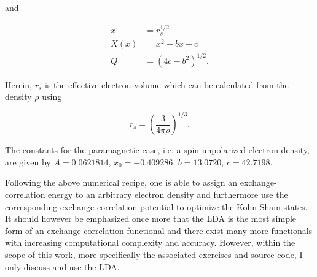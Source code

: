 and

\begin{align}
	x &= r_{s}^{1/2} \\
	X(x) &= x^{2} + bx + c \\
	Q &= \left(4c - b^{2}\right)^{1/2}.
\end{align}

Herein, $r_{s}$ is the effective electron volume which can be calculated from the density $\rho$ using

\begin{equation}
	r_{s} = \left( \dfrac{3}{4 \pi \rho} \right)^{1/3}.
\end{equation}

The constants for the paramagnetic case, i.e. a spin-unpolarized electron density, are given by $A = 0.0621814$, $x_{0} = -0.409286$, $b = 13.0720$, $c = 42.7198$.

Following the above numerical recipe, one is able to assign an exchange-correlation energy to an arbitrary electron density and furthermore use the corresponding exchange-correlation potential to optimize the Kohn-Sham states. It should however be emphasized once more that the LDA is the most simple form of an exchange-correlation functional and there exist many more functionals with increasing computational complexity and accuracy. However, within the scope of this work, more specifically the associated exercises and source code, I only discuss and use the LDA.